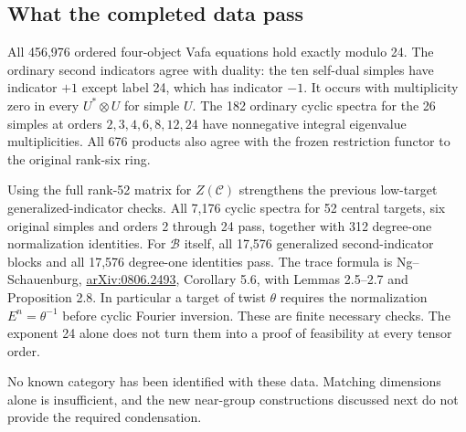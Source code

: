 \subsection{What the completed data pass}

All 456,976 ordered four-object Vafa equations hold exactly modulo 24.
The ordinary second indicators agree with duality: the ten self-dual
simples have indicator $+1$ except label 24, which has indicator $-1$.
It occurs with multiplicity zero in every $U^*\otimes U$ for simple
$U$. The 182 ordinary cyclic spectra for the 26 simples at orders
$2,3,4,6,8,12,24$ have nonnegative integral eigenvalue multiplicities.
All 676 products also agree with the frozen restriction functor to
the original rank-six ring.

Using the full rank-52 matrix for $Z(\mathcal C)$ strengthens the previous
low-target generalized-indicator checks. All 7,176 cyclic spectra for
52 central targets, six original simples and orders 2 through 24
pass, together with 312 degree-one normalization identities.
For $\mathcal B$ itself, all 17,576 generalized second-indicator blocks
and all 17,576 degree-one identities pass.
The trace formula is Ng--Schauenburg,
\href{https://arxiv.org/abs/0806.2493}{arXiv:0806.2493},
Corollary 5.6, with Lemmas 2.5--2.7 and Proposition 2.8.
In particular a target of twist $\theta$ requires the normalization
$E^n=\theta^{-1}$ before cyclic Fourier inversion.
These are finite necessary checks. The exponent 24 alone does not
turn them into a proof of feasibility at every tensor order.

No known category has been identified with these data. Matching
dimensions alone is insufficient, and the new near-group constructions
discussed next do not provide the required condensation.

